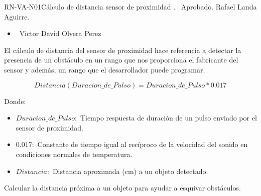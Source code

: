 %
\begin{BusinessRule}{RN-VA-N01}{Cálculo de distancia sensor de proximidad}
	{\bcDerivation}
	{\btEnabler}
	{\blControlling}
	.
	\BRItem[Estado] \ Aprobado.
	 Rafael Landa Aguirre.
	 \cdtEmpty
	\begin{itemize}
		\item \ Victor David Olvera Perez
	\end{itemize}
	\BRItem[Descripción] El cálculo de distancia del sensor de proximidad 
	hace referencia a detectar la presencia de un obstáculo en un rango que 
	nos proporciona el fabricante del sensor y además, un rango que el 
	desarrollador puede programar.
	
	\BRItem[Sentencia] \cdtEmpty

	\begin{equation*}
	Distancia(Duracion\_de\_Pulso) = Duracion\_de\_Pulso * 0.017
	\end{equation*}

	Donde:
	\begin{itemize}
		\item \textit{$Duracion\_de\_Pulso:$} Tiempo respuesta de 
		duración de un pulso enviado por el sensor de proximidad.
		\item \textit{$0.017:$} Constante de tiempo igual al recíproco 
		de la velocidad del sonido en condiciones normales de 
		temperatura.
		\item \textit{$Distancia:$} Distancia aproximada (cm) a un 
		objeto detectado.
	\end{itemize}

	\BRItem[Motivación] Calcular la distancia próxima a un objeto para 
	ayudar a esquivar obstáculos.
\end{BusinessRule}

